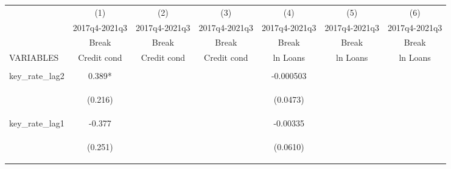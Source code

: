 \documentclass[]{article}
\begin{document}
\begin{center}
\begin{tabular}{lcccccc} \hline
 & (1) & (2) & (3) & (4) & (5) & (6) \\
 & 2017q4-2021q3 & 2017q4-2021q3 & 2017q4-2021q3 & 2017q4-2021q3 & 2017q4-2021q3 & 2017q4-2021q3 \\
 & Break & Break & Break & Break & Break & Break \\
VARIABLES & Credit cond & Credit cond & Credit cond & ln Loans & ln Loans & ln Loans \\ \hline
\vspace{4pt} & \begin{footnotesize}\end{footnotesize} & \begin{footnotesize}\end{footnotesize} & \begin{footnotesize}\end{footnotesize} & \begin{footnotesize}\end{footnotesize} & \begin{footnotesize}\end{footnotesize} & \begin{footnotesize}\end{footnotesize} \\
key\_rate\_lag2 & 0.389* &  &  & -0.000503 &  &  \\
\vspace{4pt} & \begin{footnotesize}(0.216)\end{footnotesize} & \begin{footnotesize}\end{footnotesize} & \begin{footnotesize}\end{footnotesize} & \begin{footnotesize}(0.0473)\end{footnotesize} & \begin{footnotesize}\end{footnotesize} & \begin{footnotesize}\end{footnotesize} \\
key\_rate\_lag1 & -0.377 &  &  & -0.00335 &  &  \\
\vspace{4pt} & \begin{footnotesize}(0.251)\end{footnotesize} & \begin{footnotesize}\end{footnotesize} & \begin{footnotesize}\end{footnotesize} & \begin{footnotesize}(0.0610)\end{footnotesize} & \begin{footnotesize}\end{footnotesize} & \begin{footnotesize}\end{footnotesize} \\

\end{tabular}
\end{center}
\end{document}
